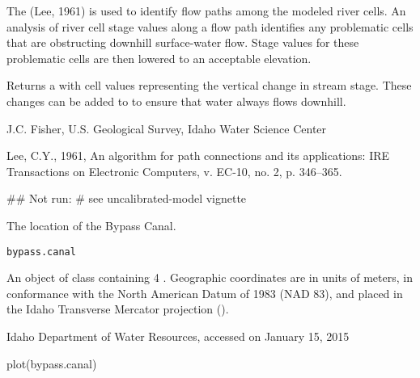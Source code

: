\documentclass[letterpaper]{book}
\begin{document}
%
\begin{Details}\relax
The  (Lee, 1961) is used to identify flow paths among the modeled river cells.
An analysis of river cell stage values along a flow path identifies any problematic cells that are obstructing downhill surface-water flow.
Stage values for these problematic cells are then lowered to an acceptable elevation.
\end{Details}
%
\begin{Value}
Returns a  with cell values representing the vertical change in stream stage.
These changes can be added to  to ensure that water always flows downhill.
\end{Value}
%
\begin{Author}\relax
J.C. Fisher, U.S. Geological Survey, Idaho Water Science Center
\end{Author}
%
\begin{References}\relax
Lee, C.Y., 1961, An algorithm for path connections and its applications: IRE Transactions on Electronic Computers, v. EC-10, no. 2, p. 346--365.
\end{References}
%
\begin{Examples}
\begin{ExampleCode}
## Not run: # see uncalibrated-model vignette
\end{ExampleCode}
\end{Examples}
%
\begin{Description}\relax
The location of the Bypass Canal.
\end{Description}
%
\begin{Usage}
\begin{verbatim}
bypass.canal
\end{verbatim}
\end{Usage}
%
\begin{Format}
An object of  class containing 4 .
Geographic coordinates are in units of meters, in conformance with the North American Datum of 1983 (NAD 83), and placed in the
Idaho Transverse Mercator projection ().
\end{Format}
%
\begin{Source}\relax
Idaho Department of Water Resources, accessed on January 15, 2015
\end{Source}
%
\begin{Examples}
\begin{ExampleCode}
plot(bypass.canal)
\end{ExampleCode}
\end{Examples}
\end{document}
